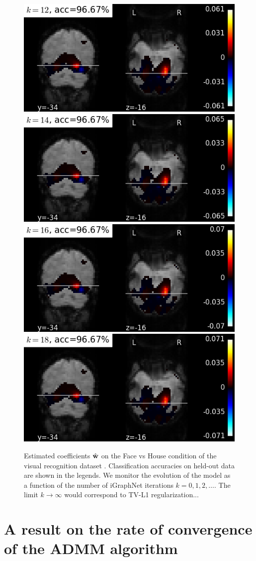 \begin{figure}[!tb]
    \includegraphics[width=.5\linewidth]{figures/haxby_igraphnet_w_12_yz.png}
    \includegraphics[width=.5\linewidth]{figures/haxby_igraphnet_w_14_yz.png}
    \includegraphics[width=.5\linewidth]{figures/haxby_igraphnet_w_16_yz.png}
    \includegraphics[width=.5\linewidth]{figures/haxby_igraphnet_w_18_yz.png}
\caption{Estimated coefficients $\hat{\mathbf{w}}$ on the Face vs House condition
      of the visual recognition dataset \citep{haxby2001}.
Classification accuracies on held-out data are shown in the
legends. We monitor the evolution of the model as a function of the number of iGraphNet iterations $k = 0, 1, 2,\ldots$. The limit $k \rightarrow \infty$ would correspond to TV-L1 regularization...
}
\label{fig:igraphnet}
\end{figure}

\chapter{A result on the rate of convergence of the ADMM algorithm}
\label{chap:admm}

